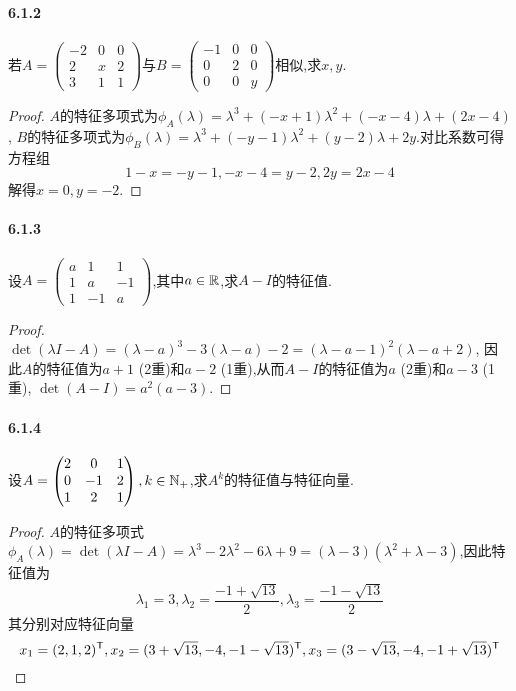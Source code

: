 \documentclass[11pt]{article}
\begin{document}
\paragraph{6.1.2}若$A=\begin{pmatrix}
    -2&0&0\\ 2&x&2\\ 3&1&1
\end{pmatrix}$与$B=\begin{pmatrix}
    -1&0&0\\ 0&2&0\\ 0&0&y
\end{pmatrix}$相似,求$x,y$.
\begin{proof}
    $A$的特征多项式为$\phi_A(\lambda)=\lambda^3+(-x+1)\lambda^2+(-x-4)\lambda+(2x-4)$, $B$的特征多项式为$\phi_B(\lambda)=\lambda^3+(-y-1)\lambda^2+(y-2)\lambda+2y$.对比系数可得方程组
    $$1-x=-y-1, -x-4=y-2, 2y=2x-4$$
    解得$x=0, y=-2$.
\end{proof}
\paragraph{6.1.3}设$A=\begin{pmatrix}
    a&1&1\\ 1&a&-1\\ 1&-1&a
\end{pmatrix}$,其中$a\in \mathbb{R}$,求$A-I$的特征值.
\begin{proof}
    $\det(\lambda I-A)=(\lambda-a)^3-3(\lambda-a)-2=(\lambda-a-1)^2(\lambda-a+2)$, 因此$A$的特征值为$a+1$ (2重)和$a-2$ (1重),从而$A-I$的特征值为$a$ (2重)和$a-3$ (1重), $\det(A-I)=a^2(a-3)$.
\end{proof}
\paragraph{6.1.4}设$A=\begin{pmatrix}
    2&0&1\\ 0&-1&2\\ 1&2&1
\end{pmatrix}, k\in\mathbb{N}_+$,求$A^k$的特征值与特征向量.
\begin{proof}
    $A$的特征多项式$\phi_A(\lambda)=\det(\lambda I-A)=\lambda^3-2 \lambda^2-6 \lambda+9=(\lambda-3)(\lambda^2+\lambda-3)$,因此特征值为
    $$\lambda_1=3, \lambda_2=\frac{-1+\sqrt{13}}{2}, \lambda_3=\frac{-1-\sqrt{13}}{2}$$
    其分别对应特征向量
    $$x_1=(2,1,2)^{\mathsf{T}}, x_2=(3+\sqrt{13}, -4, -1-\sqrt{13})^{\mathsf{T}}, x_3=(3-\sqrt{13},-4,-1+\sqrt{13})^{\mathsf{T}}$$
\end{proof}
\end{document}
